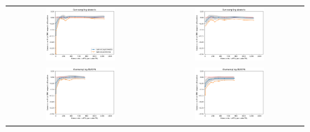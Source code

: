 \begin{figure}[h!]
\begin{tabular}{cc}
  \includegraphics[width=0.49\textwidth]{Kap7/aleatorio_linearBEST.png} & \includegraphics[width=0.49\textwidth]{Kap7/aleatorio_rbfBEST.png} \\
   \includegraphics[width=0.49\textwidth]{Kap7/ADASYN_linearBEST.png} & \includegraphics[width=0.49\textwidth]{Kap7/ADASYN_rbfBEST.png} \\

\end{tabular}
\end{figure}
